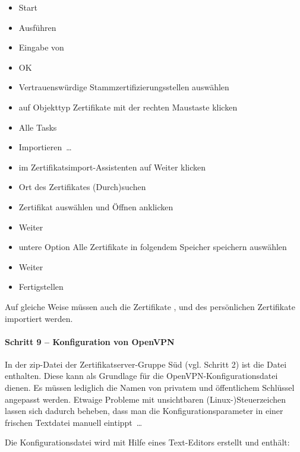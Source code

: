 \begin{itemize}
  \item \glqq{}Start\grqq{}
  \item \glqq{}Ausführen\grqq{}
  \item Eingabe von 
  \item \glqq{}OK\grqq{}
  \item \glqq{}Vertrauenswürdige Stammzertifizierungsstellen\grqq{} auswählen
  \item auf Objekttyp \glqq{}Zertifikate\grqq{} mit der rechten Maustaste klicken
  \item \glqq{}Alle Tasks\grqq{}
  \item \glqq{}Importieren~\dots\grqq{} 
  \item im Zertifikatsimport-Assistenten auf \glqq{}Weiter\grqq{} klicken
  \item Ort des Zertifikates \glqq{}(Durch)suchen\grqq{}
  \item Zertifikat auswählen und \glqq{}Öffnen\grqq{} anklicken
  \item \glqq{}Weiter\grqq{}
  \item untere Option \glqq{}Alle Zertifikate in folgendem Speicher speichern\grqq{} auswählen
  \item \glqq{}Weiter\grqq{}
  \item \glqq{}Fertigstellen\grqq{}
\end{itemize}

Auf gleiche Weise müssen auch die Zertifikate
,  und des
persönlichen Zertifikate  importiert
werden.

\paragraph{Schritt 9 -- Konfiguration von OpenVPN}

In der zip-Datei der Zertifikatserver-Gruppe Süd (vgl. Schritt 2) ist die Datei
 enthalten. Diese kann als Grundlage für die
OpenVPN\hyp Konfigurationsdatei dienen. Es müssen lediglich die Namen von privatem
und öffentlichem Schlüssel angepasst werden. Etwaige Probleme mit unsichtbaren
(Linux-)Steuerzeichen lassen sich \zB{} dadurch beheben, dass man die
Konfigurationsparameter in einer \glqq{}frischen\grqq{} Textdatei manuell eintippt~\dots

Die Konfigurationsdatei  wird mit Hilfe eines
Text-Editors erstellt und enthält:

